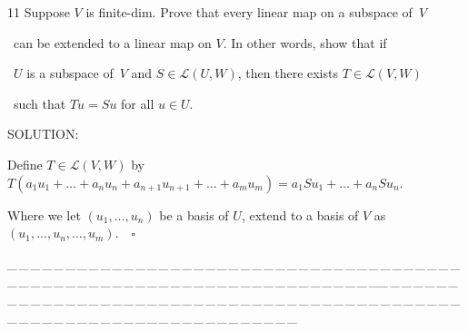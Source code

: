 \documentclass[a4paper, 11pt, UTF8]{article}
\def\Lm{\mathcal{L}}
\begin{document}
\begin{large}
{\timesbf\Large 11} {\timessl\Large 
Suppose $V$ is finite-dim. Prove that every linear map on a subspace of \,$V$}\par\quad\,
{\timessl\Large can be extended to a linear map on $V$. In other words, show that if}\par\quad\,
{\timessl\Large $U$ is a subspace of \,$V$ and $S\in\Lm(U, W)$, then there exists $T\in\Lm(V, W)$}\par\quad\,
{\timessl\Large such that $Tu = Su$ for all $u\in U$.
}\par
{\timesbf S\footnotesize{OLUTION:}}\par\quad
Define $T\in\Lm(V,W)$ by $T(a_1 u_1+\dots+a_n u_n+a_{n+1}u_{n+1}+\dots+a_m u_m)=a_1 Su_1+\dots+a_n Su_n.$\par\quad
Where we let $(u_1,\dots,u_n)$ be a basis of $U$, extend to a basis of $V$ as $(u_1,\dots,u_n,\dots,u_m)$.$\quad\square$\par
{\tiny \_\,\_\,\_\,\_\,\_\,\_\,\_\,\_\,\_\,\_\,\_\,\_\,\_\,\_\,\_\,\_\,\_\,\_\,\_\,\_\,\_\,\_\,\_\,\_\,\_\,\_\,\_\,\_\,\_\,\_\,\_\,\_\,\_\,\_\,\_\,\_\,\_\,\_\,\_\,\_\,\_\,\_\,\_\,\_\,\_\,\_\,\_\,\_\,\_\,\_\,\_\,\_\,\_\,\_\,\_\,\_\,\_\,\_\,\_\,\_\,\_\,\_\,\_\,\_\,\_\,\_\,\_\,\_\,\_\,\_\,\_\_\,\_\,\_\,\_\,\_\,\_\,\_\,\_\,\_\,\_\,\_\,\_\,\_\,\_\,\_\,\_\,\_\,\_\,\_\,\_\,\_\,\_\,\_\,\_\,\_\,\_\,\_\,\_\,\_\,\_\,\_\,\_\,\_\,\_\,\_\,\_\,\_\,\_\,\_\,\_\,\_\,\_\,\_\,\_\,\_\,\_\,\_\,\_\,\_\,\_\,\_\,\_\,\_\,\_\,\_\,\_\,\_\,\_\,\_\,\_\,\_\,\_\,\_\,\_\,\_\,\_\,\_\,\_\,\_\,\_\,\_}\par


\end{large}
\end{document}
